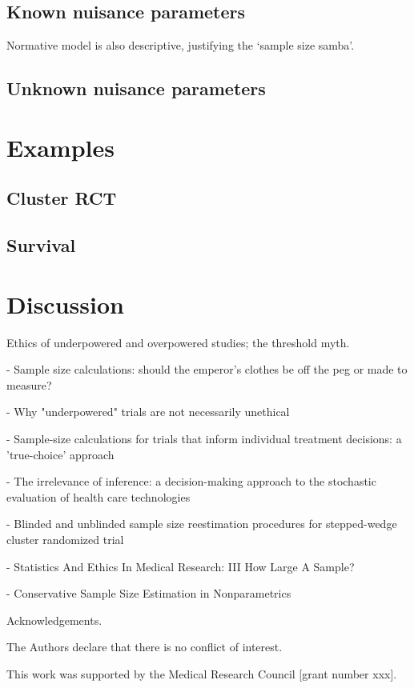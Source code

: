 \documentclass[sagev]{sagej}
\begin{document}
\subsection{Known nuisance parameters}

Normative model is also descriptive, justifying the `sample size samba'.

\subsection{Unknown nuisance parameters}



\section{Examples}

\subsection{Cluster RCT}

\subsection{Survival}

\section{Discussion}

Ethics of underpowered and overpowered studies; the threshold myth.

\cite{Norman2012} - Sample size calculations: should the emperor's clothes be off the peg or made to measure?

\cite{Edwards1997} - Why "underpowered" trials are not necessarily unethical

\cite{Girling2007} - Sample-size calculations for trials that inform individual treatment decisions: a 'true-choice' approach

\cite{Claxton1999} - The irrelevance of inference: a decision-making approach to the stochastic evaluation of health care technologies

\cite{Grayling2018} - Blinded and unblinded sample size reestimation procedures for stepped-wedge cluster randomized trial

\cite{Altman1980} - Statistics And Ethics In Medical Research: III How Large A Sample?

\cite{DeMartini2010} - Conservative Sample Size Estimation in Nonparametrics

\begin{acks}
Acknowledgements.
\end{acks}

\begin{dci}
The Authors declare that there is no conflict of interest.
\end{dci}

\begin{funding}
This work was supported by the Medical Research Council [grant number xxx].
\end{funding}



\end{document}
